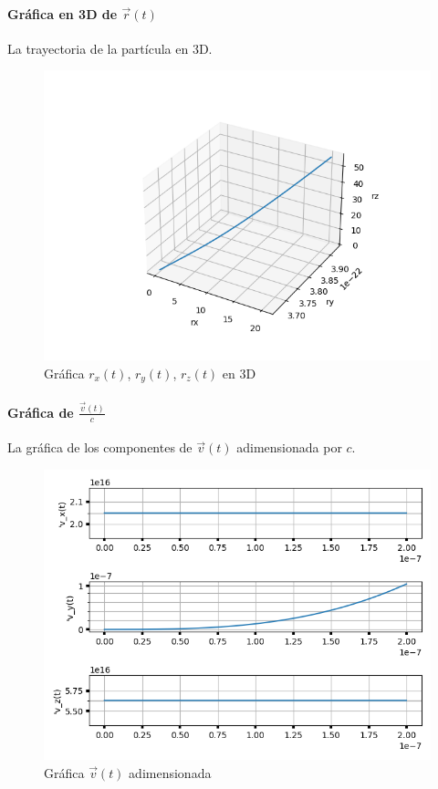 \newpage 

\paragraph{Gráfica en 3D de $\vec{r}(t)$} 
La trayectoria de la partícula en 3D.

\begin{figure}[H]
	\includegraphics[width=\linewidth]{figures/rel_3d_r.png}
	\caption{Gráfica $r_x(t)$, $r_y(t)$, $r_z(t)$ en 3D}
	\label{fig:rel_3d_r}
\end{figure}

\newpage 

\paragraph{Gráfica de $\frac{\vec{v}(t)}{c}$}

La gráfica de los componentes de $\vec{v}(t)$ adimensionada por $c$.

\begin{figure}[H]
	\includegraphics[width=\linewidth]{figures/rel_adim_vx_vy_vz.png}
	\caption{Gráfica $\vec{v}(t)$ adimensionada}
	\label{fig:rel_adim_vx_vy_vz}
\end{figure}


